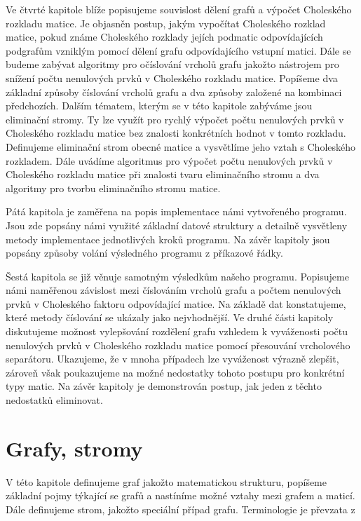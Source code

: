 \documentclass[11pt,american,czech,oneside]{book}
\theoremstyle{plain}
\theoremstyle{definition}
\begin{document}
Ve čtvrté kapitole blíže popisujeme souvislost dělení grafů a výpočet Choleského rozkladu matice. Je objasněn postup, jakým vypočítat Choleského rozklad matice, pokud známe Choleského rozklady jejích podmatic odpovídajících podgrafům vzniklým pomocí dělení grafu odpovídajícího vstupní matici. Dále se budeme zabývat algoritmy pro očíslování vrcholů grafu jakožto nástrojem pro snížení počtu nenulových prvků v Choleského rozkladu matice. Popíšeme dva základní způsoby číslování vrcholů grafu a dva způsoby založené na kombinaci předchozích. Dalším tématem, kterým se v této kapitole zabýváme jsou eliminační stromy. Ty lze využít pro rychlý výpočet počtu nenulových prvků v Choleského rozkladu matice bez znalosti konkrétních hodnot v tomto rozkladu. Definujeme eliminační strom obecné matice a vysvětlíme jeho vztah s Choleského rozkladem. Dále uvádíme algoritmus pro výpočet počtu nenulových prvků v Choleského rozkladu matice při znalosti tvaru eliminačního stromu a dva algoritmy pro tvorbu eliminačního stromu matice.

Pátá kapitola je zaměřena na popis implementace námi vytvořeného programu. Jsou zde popsány námi využité základní datové struktury a detailně vysvětleny metody implementace jednotlivých kroků programu. Na závěr kapitoly jsou popsány způsoby volání výsledného programu z příkazové řádky.

Šestá kapitola se již věnuje samotným výsledkům našeho programu. Popisujeme námi naměřenou závislost mezi číslováním vrcholů grafu a počtem nenulových prvků v Choleského faktoru odpovídající matice. Na základě dat konstatujeme, které metody číslování se ukázaly jako nejvhodnější. Ve druhé části kapitoly diskutujeme možnost vylepšování rozdělení grafu vzhledem k vyváženosti počtu nenulových prvků v Choleského rozkladu matice pomocí přesouvání vrcholového separátoru. Ukazujeme, že v mnoha případech lze vyváženost výrazně zlepšit, zároveň však poukazujeme na možné nedostatky tohoto postupu pro konkrétní typy matic. Na závěr kapitoly je demonstrován postup, jak jeden z těchto nedostatků eliminovat.




\chapter{Grafy, stromy}
V této kapitole definujeme graf jakožto matematickou strukturu, popíšeme základní pojmy týkající se grafů a nastíníme možné vztahy mezi grafem a maticí. Dále definujeme strom, jakožto speciální případ grafu. Terminologie je převzata z \cite{koub:11}
\end{document}
